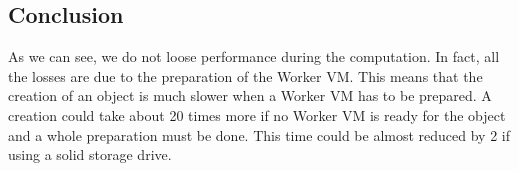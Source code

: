 \subsection{Conclusion}
As we can see, we do not loose performance during the computation. In fact, all the losses are due to the preparation of the Worker VM. This means that the creation of an object is much slower when a Worker VM has to be prepared. A creation could take about 20 times more if no Worker VM is ready for the object and a whole preparation must be done. This time could be almost reduced by 2 if using a solid storage drive. 

